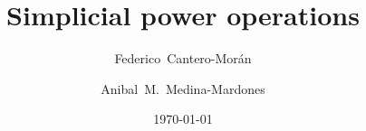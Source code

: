 \documentclass{amsart}
\title{Simplicial power operations}
\author[Cantero-Mor\'an]{Federico~Cantero-Mor\'an}
\author[Medina-Mardones]{Anibal~M.~Medina-Mardones}
\date{\today}
\begin{document}
	
	\maketitle
	\tableofcontents
	
	
	
	
	
	
	
	
	
	
	
	
	\sloppy
	\printbibliography
	\newpage
	\todos
\end{document}
